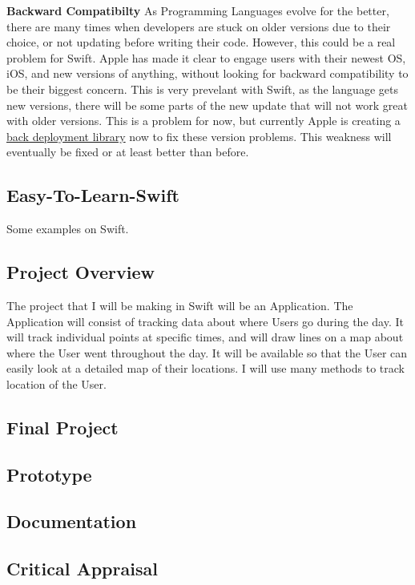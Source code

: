 \documentclass{article}
\theoremstyle{theorem}
\theoremstyle{definition}
\theoremstyle{remark}
\begin{document}
\noindent\textbf{Backward Compatibilty}\newline
As Programming Languages evolve for the better, there are many times when developers are stuck on older versions due to their choice, or not updating before writing their code. However, this could be a real problem for Swift. Apple has made it clear to engage users with their newest OS, iOS, and new versions of anything, without looking for backward compatibility to be their biggest concern. This is very prevelant with Swift, as the language gets new versions, there will be some parts of the new update that will not work great with older versions. This is a problem for now, but currently Apple is creating a \href{https://medium.com/@carlos.banos85/swift-5-5-concurrency-backward-compatibility-884fd9c284da}{back deployment library} now to fix these version problems. This weakness will eventually be fixed or at least better than before.

\subsection{Easy-To-Learn-Swift}
Some examples on Swift.

\subsection{Project Overview}
The project that I will be making in Swift will be an Application. The Application will consist of tracking data about where Users go during the day. It will track individual points at specific times, and will draw lines on a map about where the User went throughout the day. It will be available so that the User can easily look at a detailed map of their locations. I will use many methods to track location of the User.

\subsection{Final Project}

\subsection{Prototype}
\subsection{Documentation}
\subsection{Critical Appraisal}
\end{document}
